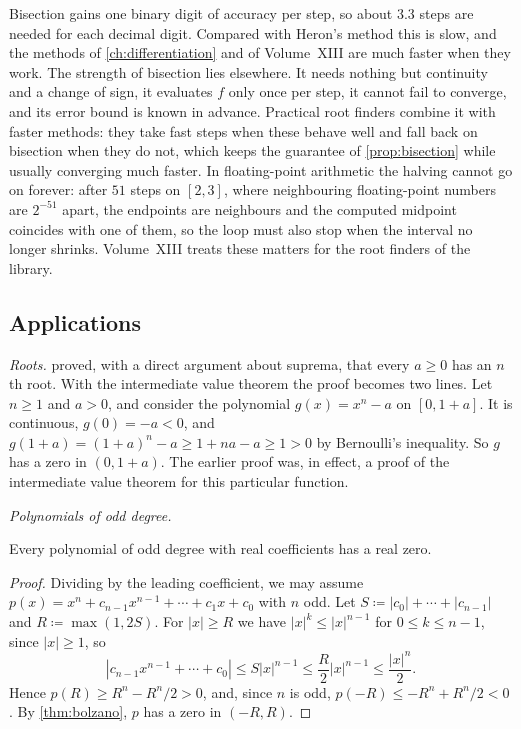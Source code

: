 Bisection gains one binary digit of accuracy per step, so about $3.3$ steps are needed for each decimal digit. Compared with Heron's method this is slow, and the methods of \cref{ch:differentiation} and of Volume~XIII are much faster when they work. The strength of bisection lies elsewhere. It needs nothing but continuity and a change of sign, it evaluates $f$ only once per step, it cannot fail to converge, and its error bound is known in advance. Practical root finders combine it with faster methods: they take fast steps when these behave well and fall back on bisection when they do not, which keeps the guarantee of \cref{prop:bisection} while usually converging much faster. In floating-point arithmetic the halving cannot go on forever: after $51$ steps on $[2,3]$, where neighbouring floating-point numbers are $2^{-51}$ apart, the endpoints are neighbours and the computed midpoint coincides with one of them, so the loop must also stop when the interval no longer shrinks. Volume~XIII treats these matters for the root finders of the library.

\subsection{Applications}

\emph{Roots.}  proved, with a direct argument about suprema, that every $a\ge0$ has an $n$th root. With the intermediate value theorem the proof becomes two lines. Let $n\ge1$ and $a>0$, and consider the polynomial $g(x)=x^n-a$ on $[0,1+a]$. It is continuous, $g(0)=-a<0$, and $g(1+a)=(1+a)^n-a\ge1+na-a\ge1>0$ by Bernoulli's inequality. So $g$ has a zero in $(0,1+a)$. The earlier proof was, in effect, a proof of the intermediate value theorem for this particular function.

\emph{Polynomials of odd degree.}

\begin{proposition}
\label{prop:odd-degree}
Every polynomial of odd degree with real coefficients has a real zero.
\end{proposition}

\begin{proof}
Dividing by the leading coefficient, we may assume $p(x)=x^n+c_{n-1}x^{n-1}+\cdots+c_1x+c_0$ with $n$ odd. Let $S\coloneqq|c_0|+\cdots+|c_{n-1}|$ and $R\coloneqq\max(1,2S)$. For $|x|\ge R$ we have $|x|^k\le|x|^{n-1}$ for $0\le k\le n-1$, since $|x|\ge1$, so
\[
|c_{n-1}x^{n-1}+\cdots+c_0|\le S|x|^{n-1}\le\frac R2|x|^{n-1}\le\frac{|x|^n}2 .
\]
Hence $p(R)\ge R^n-R^n/2>0$, and, since $n$ is odd, $p(-R)\le-R^n+R^n/2<0$. By \cref{thm:bolzano}, $p$ has a zero in $(-R,R)$.
\end{proof}

